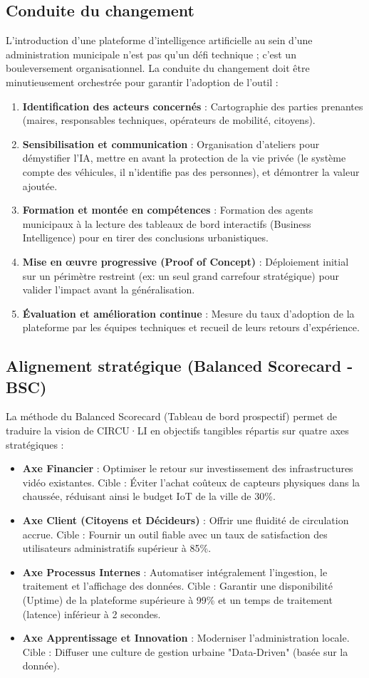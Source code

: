 \subsection{Conduite du changement}
L’introduction d’une plateforme d'intelligence artificielle au sein d'une administration municipale n'est pas qu'un défi technique ; c'est un bouleversement organisationnel. La conduite du changement doit être minutieusement orchestrée pour garantir l'adoption de l'outil :
\begin{enumerate}
    \item \textbf{Identification des acteurs concernés} : Cartographie des parties prenantes (maires, responsables techniques, opérateurs de mobilité, citoyens).
    \item \textbf{Sensibilisation et communication} : Organisation d'ateliers pour démystifier l'IA, mettre en avant la protection de la vie privée (le système compte des véhicules, il n'identifie pas des personnes), et démontrer la valeur ajoutée.
    \item \textbf{Formation et montée en compétences} : Formation des agents municipaux à la lecture des tableaux de bord interactifs (Business Intelligence) pour en tirer des conclusions urbanistiques.
    \item \textbf{Mise en œuvre progressive (Proof of Concept)} : Déploiement initial sur un périmètre restreint (ex: un seul grand carrefour stratégique) pour valider l'impact avant la généralisation.
    \item \textbf{Évaluation et amélioration continue} : Mesure du taux d'adoption de la plateforme par les équipes techniques et recueil de leurs retours d'expérience.
\end{enumerate}

\subsection{Alignement stratégique (Balanced Scorecard - BSC)}
La méthode du Balanced Scorecard (Tableau de bord prospectif) permet de traduire la vision de CIRCU·LI en objectifs tangibles répartis sur quatre axes stratégiques :
\begin{itemize}
    \item \textbf{Axe Financier} : Optimiser le retour sur investissement des infrastructures vidéo existantes. Cible : Éviter l'achat coûteux de capteurs physiques dans la chaussée, réduisant ainsi le budget IoT de la ville de 30\%.
    \item \textbf{Axe Client (Citoyens et Décideurs)} : Offrir une fluidité de circulation accrue. Cible : Fournir un outil fiable avec un taux de satisfaction des utilisateurs administratifs supérieur à 85\%.
    \item \textbf{Axe Processus Internes} : Automatiser intégralement l'ingestion, le traitement et l'affichage des données. Cible : Garantir une disponibilité (Uptime) de la plateforme supérieure à 99\% et un temps de traitement (latence) inférieur à 2 secondes.
    \item \textbf{Axe Apprentissage et Innovation} : Moderniser l'administration locale. Cible : Diffuser une culture de gestion urbaine "Data-Driven" (basée sur la donnée).
\end{itemize}

